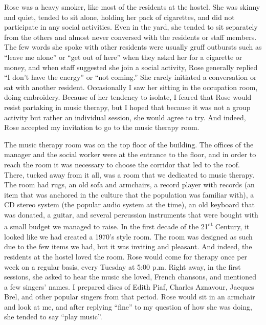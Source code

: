 \documentclass[authordate, empirical]{jote-new-article}
\begin{document}
Rose was a heavy smoker, like most of the residents at the hostel. She was skinny and quiet, tended to sit alone, holding her pack of cigarettes, and did not participate in any social activities. Even in the yard, she tended to sit separately from the others and almost never conversed with the residents or staff members. The few words she spoke with other residents were usually gruff outbursts such as “leave me alone” or “get out of here” when they asked her for a cigarette or money, and when staff suggested she join a social activity, Rose generally replied “I don't have the energy” or “not coming.” She rarely initiated a conversation or sat with another resident. Occasionally I saw her sitting in the occupation room, doing embroidery. Because of her tendency to isolate, I feared that Rose would resist partaking in music therapy, but I hoped that because it was not a group activity but rather an individual session, she would agree to try. And indeed, Rose accepted my invitation to go to the music therapy room.



The music therapy room was on the top floor of the building. The offices of the manager and the social worker were at the entrance to the floor, and in order to reach the room it was necessary to choose the corridor that led to the roof. There, tucked away from it all, was a room that we dedicated to music therapy. The room had rugs, an old sofa and armchairs, a record player with records (an item that was anchored in the culture that the population was familiar with), a CD stereo system (the popular audio system at the time), an old keyboard that was donated, a guitar, and several percussion instruments that were bought with a small budget we managed to raise. In the first decade of the 21\textsuperscript{st} Century, it looked like we had created a 1970's style room. The room was designed as such due to the few items we had, but it was inviting and pleasant. And indeed, the residents at the hostel loved the room. Rose would come for therapy once per week on a regular basis, every Tuesday at 5:00 p.m. Right away, in the first sessions, she asked to hear the music she loved, French chansons, and mentioned a few singers' names. I prepared discs of Edith Piaf, Charles Aznavour, Jacques Brel, and other popular singers from that period. Rose would sit in an armchair and look at me, and after replying “fine” to my question of how she was doing, she tended to say “play music”.
\end{document}
